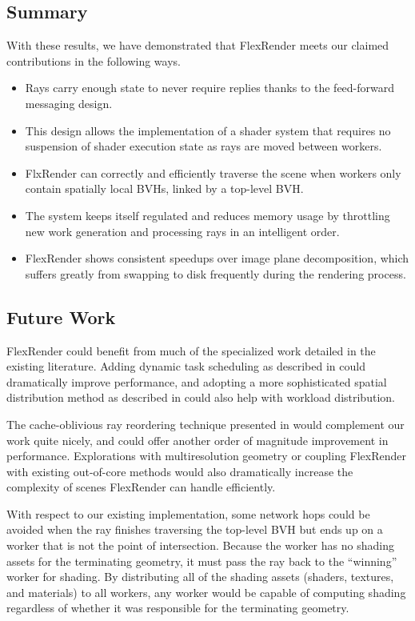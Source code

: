 \documentclass[a4paper,twoside]{article}
\begin{document}
\subsection{Summary}
\label{resultssummary}

With these results, we have demonstrated that FlexRender meets our claimed
contributions in the following ways.

\begin{itemize}
    \item Rays carry enough state to never require replies thanks to the
        feed-forward messaging design.
    \item This design allows the implementation of a shader system that requires
        no suspension of shader execution state as rays are moved between
        workers.
    \item FlxRender can correctly and efficiently traverse the scene when workers
        only contain spatially local BVHs, linked by a top-level BVH.
    \item The system keeps itself regulated and reduces memory usage by
        throttling new work generation and processing rays in an intelligent
        order.
    \item FlexRender shows consistent speedups over image plane decomposition,
        which suffers greatly from swapping to disk frequently during the
        rendering process.
\end{itemize}

\subsection{Future Work}
\label{futurework}

FlexRender could benefit from much of the specialized work detailed in the
existing literature. Adding dynamic task scheduling as described in
\cite{navratil:2012} could dramatically improve performance, and adopting a
more sophisticated spatial distribution method as described in
\cite{badouel:1994} could also help with workload distribution.

The cache-oblivious ray reordering technique presented in \cite{moon:2010}
would complement our work quite nicely, and could offer another order of
magnitude improvement in performance. Explorations with multiresolution geometry
or coupling FlexRender with existing out-of-core methods would also dramatically
increase the complexity of scenes FlexRender can handle efficiently.

With respect to our existing implementation, some network hops could be
avoided when the ray finishes traversing the top-level BVH but ends up on a
worker that is not the point of intersection.  Because the worker has no
shading assets for the terminating geometry, it must pass the ray back to the
``winning'' worker for shading. By distributing all of the shading assets
(shaders, textures, and materials) to all workers, any worker would be capable
of computing shading regardless of whether it was responsible for the
terminating geometry.
\end{document}
